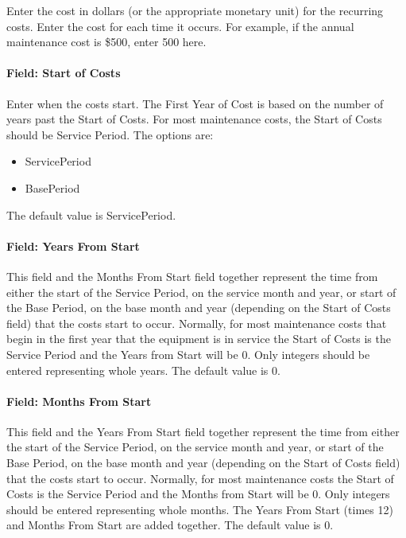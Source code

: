 Enter the cost in dollars (or the appropriate monetary unit) for the recurring costs. Enter the cost for each time it occurs. For example, if the annual maintenance cost is \$500, enter 500 here.

\paragraph{Field: Start of Costs}\label{field-start-of-costs-000}

Enter when the costs start. The First Year of Cost is based on the number of years past the Start of Costs. For most maintenance costs, the Start of Costs should be Service Period. The options are:

\begin{itemize}
\item
  ServicePeriod
\item
  BasePeriod
\end{itemize}

The default value is ServicePeriod.

\paragraph{Field: Years From Start}\label{field-years-from-start-000}

This field and the Months From Start field together represent the time from either the start of the Service Period, on the service month and year, or start of the Base Period, on the base month and year (depending on the Start of Costs field) that the costs start to occur. Normally, for most maintenance costs that begin in the first year that the equipment is in service the Start of Costs is the Service Period and the Years from Start will be 0. Only integers should be entered representing whole years. The default value is 0.

\paragraph{Field: Months From Start}\label{field-months-from-start-000}

This field and the Years From Start field together represent the time from either the start of the Service Period, on the service month and year, or start of the Base Period, on the base month and year (depending on the Start of Costs field) that the costs start to occur. Normally, for most maintenance costs the Start of Costs is the Service Period and the Months from Start will be 0. Only integers should be entered representing whole months. The Years From Start (times 12) and Months From Start are added together. The default value is 0.

